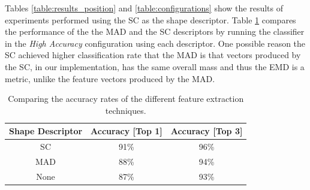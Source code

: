 Tables \ref{table:results_position} and \ref{table:configurations} show the results of experiments performed using the SC as the shape descriptor.
Table \ref{table:features_comparison} compares the performance of the the MAD and the SC descriptors by running the classifier in the \emph{High Accuracy} configuration using each descriptor.
One possible reason the SC achieved higher classification rate that the MAD is that vectors produced by the SC, in our implementation, has the same overall mass and thus the EMD is a metric, unlike the feature vectors produced by the MAD.

\begin{table}
\centering
\caption{Comparing the accuracy rates of the different feature extraction techniques.}
\renewcommand{\arraystretch}{1.2}
\begin{tabular}{ c c c }
\toprule
	\textbf{Shape Descriptor}  & \textbf{Accuracy [Top 1]}  & \textbf{Accuracy [Top 3]} \\
	\midrule 
	SC      & 91\% & 96\%  \\                
  	MAD     & 88\% & 94\% \\
  	None    & 87\% & 93\% \\
  	\bottomrule
\end{tabular}
\label{table:features_comparison} 
\end{table}


%
%
%
